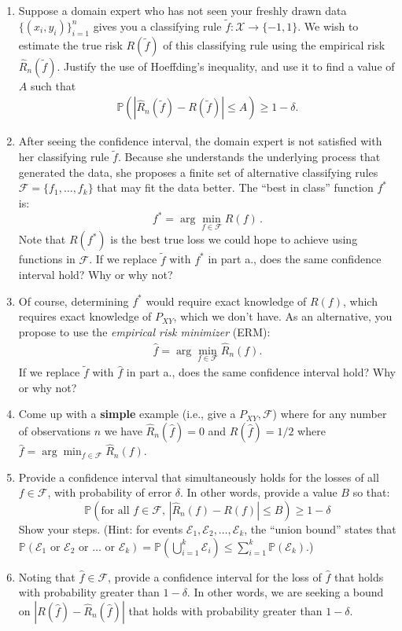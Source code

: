 \documentclass{article}
\newcommand{\1}{\mathbf{1}}
\renewcommand{\P}{\mathbb{P}} %
\begin{document}
\begin{enumerate}
  \item Suppose a domain expert who has not seen your freshly drawn data $\{(x_i,y_i)\}_{i=1}^n$ gives you a classifying rule $\widetilde{f}:\mathcal{X} \rightarrow \{-1,1\}$. We wish to estimate the true risk $R(\widetilde{f})$ of this classifying rule using the empirical risk $\widehat{R}_n(\widetilde{f})$. Justify the use of Hoeffding's inequality, and use it to find a value of $A$ such that
  \begin{align*}
  \P( | \widehat{R}_n(\widetilde{f}) - R(\widetilde{f}) | \leq A ) \geq 1- \delta.
  \end{align*}
  \item After seeing the confidence interval, the domain expert is not satisfied with her classifying rule $\widetilde{f}$. Because she understands the underlying process that generated the data, she proposes a finite set of alternative classifying rules $\mathcal{F} = \{ f_1,\dots,f_k \}$ that may fit the data better.
  The ``best in class'' function $f^*$ is:
  \[
  f^* = \arg\min_{f \in \mathcal{F}} R(f) \, . 
  \]
  Note that $R(f^*)$ is the best true loss we could hope to achieve using functions in $\mathcal{F}$.
  If we replace $\widetilde{f}$ with $f^*$ in part a., does the same confidence interval hold? Why or why not?
  \item Of course, determining $f^*$ would require exact knowledge of $R(f)$, which requires exact knowledge of $P_{XY}$, which we don't have. 
  As an alternative, you propose to use the \emph{empirical risk minimizer} (ERM):
  \begin{align*}
  \widehat f = \arg\min_{f\in\mathcal{F}} \widehat R_n(f).
  \end{align*}
  If we replace $\widetilde{f}$ with $\widehat{f}$ in part a., does the same confidence interval hold? Why or why not? 
  \item Come up with a \textbf{simple} example (i.e., give a $P_{XY},\mathcal{F}$) where for any number of observations $n$ we have $\widehat{R}_n(\widehat{f})=0$ and $R(\widehat{f})=1/2$ where $\widehat{f} = \arg\min_{f \in \mathcal{F}} \widehat{R}_n(f)$.  
  \item  Provide a confidence interval that simultaneously holds for the losses of all $f \in \mathcal{F}$, with probability of error $\delta$. In other words, provide a value $B$ so that:
\[
\P( \textrm{for all } f\in\mathcal{F}, \, |\widehat R_n(f) -  R(f)|
\leq B ) \geq 1- \delta
\]
Show your steps. (Hint: for events $\mathcal{E}_1, \mathcal{E}_2, \ldots, \mathcal{E}_k$, the ``union bound'' states that  $\P(\mathcal{E}_1 \textrm{ or } \mathcal{E}_2 \textrm{ or } \dots \text{ or } \mathcal{E}_k) = \P(\bigcup_{i=1}^k \mathcal{E}_i ) \leq \sum_{i=1}^k \P(\mathcal{E}_k)$.)
\item Noting that $\widehat{f} \in \mathcal{F}$, provide a confidence interval for the loss of $\widehat f$ that holds with
  probability greater than $1-\delta$. In other words, we are seeking
  a bound on $|R(\widehat f)-\widehat R_n(\widehat f)|$ that holds with probability greater than $1-\delta$.


\end{enumerate}
\end{document}
